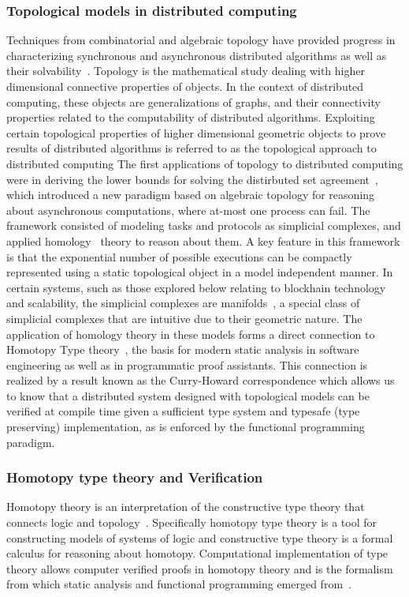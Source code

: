 \documentclass[runningheads]{llncs}
\begin{document}
\subsubsection{Topological models in distributed computing}
Techniques from combinatorial and algebraic topology have provided progress in characterizing synchronous and asynchronous distributed algorithms as well as their solvability~\cite{ref_article1,ref_article2,ref_article3, ref_article4}. Topology is the mathematical study dealing with higher dimensional connective properties of objects. In the context of distributed computing, these objects are generalizations of graphs, and their connectivity properties related to the computability of distributed algorithms. Exploiting certain topological properties of higher dimensional geometric objects to prove results of distributed algorithms is referred to as the topological approach to distributed computing
The first applications of topology to distributed computing were in deriving the lower bounds for solving the distirbuted set agreement~\cite{ref_article12}, which introduced a new paradigm based on algebraic topology for reasoning about asynchronous computations, where at-most one process can fail. The framework consisted of modeling tasks and protocols as simplicial complexes, and applied homology~\cite{ref_article5,ref_article9} theory to reason about them. A key feature in this framework is that the exponential number of possible executions can be compactly represented using a static topological object in a model independent manner. In certain systems, such as those explored below relating to blockhain technology and scalability, the simplicial complexes are manifolds~\cite{ref_article6,ref_article7,ref_article8}, a special class of simplicial complexes that are intuitive due to their geometric nature. The application of homology theory in these models forms a direct connection to Homotopy Type theory~\cite{ref_article9,ref_article10}, the basis for modern static analysis in software engineering as well as in programmatic proof assistants. This connection is realized by a result known as the Curry-Howard correspondence which allows us to know that a distributed system designed with topological models can be verified at compile time given a sufficient type system and typesafe (type preserving) implementation, as is enforced by the functional programming paradigm.

\subsubsection{Homotopy type theory and Verification}
Homotopy theory is an interpretation of the constructive type theory that connects logic and topology~\cite{ref_book1}. Specifically homotopy type theory is a tool for constructing models of systems of logic and constructive type theory is a formal calculus for reasoning about homotopy. Computational implementation of type theory allows computer verified proofs in homotopy theory and is the formalism from which static analysis and functional programming emerged from~\cite{ref_article10}.
\end{document}
